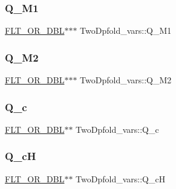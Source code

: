 \subsubsection{\texorpdfstring{Q\+\_\+\+M1}{Q\_M1}}
{\footnotesize\ttfamily \mbox{\hyperlink{group__data__structures_ga31125aeace516926bf7f251f759b6126}{F\+L\+T\+\_\+\+O\+R\+\_\+\+D\+BL}}$\ast$$\ast$$\ast$ Two\+Dpfold\+\_\+vars\+::\+Q\+\_\+\+M1}

\mbox{\label{struct_two_dpfold__vars_a92014fb41da28615679320ee56e008a0}} 
\subsubsection{\texorpdfstring{Q\+\_\+\+M2}{Q\_M2}}
{\footnotesize\ttfamily \mbox{\hyperlink{group__data__structures_ga31125aeace516926bf7f251f759b6126}{F\+L\+T\+\_\+\+O\+R\+\_\+\+D\+BL}}$\ast$$\ast$$\ast$ Two\+Dpfold\+\_\+vars\+::\+Q\+\_\+\+M2}

\mbox{\label{struct_two_dpfold__vars_aa758e10ffefee0230edc9f8542a7e883}} 
\subsubsection{\texorpdfstring{Q\+\_\+c}{Q\_c}}
{\footnotesize\ttfamily \mbox{\hyperlink{group__data__structures_ga31125aeace516926bf7f251f759b6126}{F\+L\+T\+\_\+\+O\+R\+\_\+\+D\+BL}}$\ast$$\ast$ Two\+Dpfold\+\_\+vars\+::\+Q\+\_\+c}

\mbox{\label{struct_two_dpfold__vars_a757367fbda95410ed39f5fd969420f05}} 
\subsubsection{\texorpdfstring{Q\+\_\+cH}{Q\_cH}}
{\footnotesize\ttfamily \mbox{\hyperlink{group__data__structures_ga31125aeace516926bf7f251f759b6126}{F\+L\+T\+\_\+\+O\+R\+\_\+\+D\+BL}}$\ast$$\ast$ Two\+Dpfold\+\_\+vars\+::\+Q\+\_\+cH}


